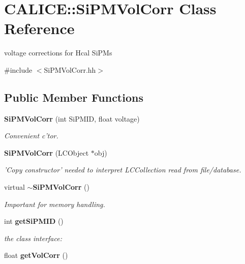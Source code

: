 \section{CALICE::SiPMVolCorr Class Reference}
\label{classCALICE_1_1SiPMVolCorr}


voltage corrections for Hcal SiPMs  


{\ttfamily \#include $<$SiPMVolCorr.hh$>$}\subsection*{Public Member Functions}
\begin{DoxyCompactItemize}
\item 
{\bf SiPMVolCorr} (int SiPMID, float voltage)\label{classCALICE_1_1SiPMVolCorr_a3346e0a35860a44163b74ae3510fe957}

\begin{DoxyCompactList}\small\item\em Convenient c'tor. \item\end{DoxyCompactList}\item 
{\bf SiPMVolCorr} (LCObject $\ast$obj)\label{classCALICE_1_1SiPMVolCorr_a99e6434d82640a89d43c59c125014d5f}

\begin{DoxyCompactList}\small\item\em 'Copy constructor' needed to interpret LCCollection read from file/database. \item\end{DoxyCompactList}\item 
virtual {\bf $\sim$SiPMVolCorr} ()\label{classCALICE_1_1SiPMVolCorr_ae0c3a7f5823b765335175f54b7886024}

\begin{DoxyCompactList}\small\item\em Important for memory handling. \item\end{DoxyCompactList}\item 
int {\bf getSiPMID} ()\label{classCALICE_1_1SiPMVolCorr_a2f24c8b0c72e8e4238e04ce92fc2dd2e}

\begin{DoxyCompactList}\small\item\em the class interface: \item\end{DoxyCompactList}\item 
float {\bfseries getVolCorr} ()\label{classCALICE_1_1SiPMVolCorr_ad9c4a3fd90f565c1919b3353b082a717}


\end{DoxyCompactItemize}
